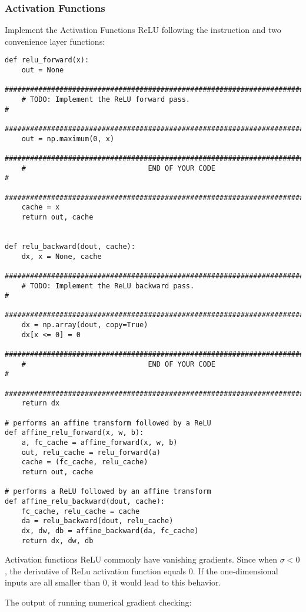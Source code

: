 \documentclass[a4paper,12pt]{article}
\begin{document}
\clearpage
\subsubsection{Activation Functions}
Implement the Activation Functions ReLU following the instruction and two convenience layer functions:
\begin{lstlisting}
def relu_forward(x):
    out = None
    ###########################################################################
    # TODO: Implement the ReLU forward pass.                                  #
    ###########################################################################
    out = np.maximum(0, x)
    ###########################################################################
    #                             END OF YOUR CODE                            #
    ###########################################################################
    cache = x
    return out, cache


def relu_backward(dout, cache):
    dx, x = None, cache
    ###########################################################################
    # TODO: Implement the ReLU backward pass.                                 #
    ###########################################################################
    dx = np.array(dout, copy=True)
    dx[x <= 0] = 0
    ###########################################################################
    #                             END OF YOUR CODE                            #
    ###########################################################################
    return dx
    
# performs an affine transform followed by a ReLU
def affine_relu_forward(x, w, b):
    a, fc_cache = affine_forward(x, w, b)
    out, relu_cache = relu_forward(a)
    cache = (fc_cache, relu_cache)
    return out, cache

# performs a ReLU followed by an affine transform 
def affine_relu_backward(dout, cache):
    fc_cache, relu_cache = cache
    da = relu_backward(dout, relu_cache)
    dx, dw, db = affine_backward(da, fc_cache)
    return dx, dw, db
\end{lstlisting}
Activation functions ReLU commonly have vanishing gradients. Since when $\sigma < 0$, the derivative of ReLu activation function equals 0. If the one-dimensional inputs are all smaller than 0, it would lead to this behavior.

The output of running numerical gradient checking:
\end{document}
